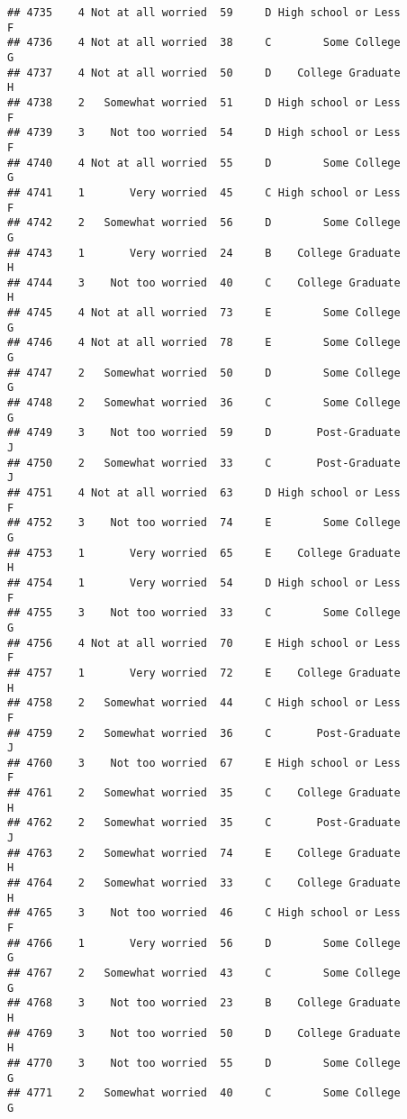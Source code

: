 \documentclass[
]{article}
\begin{document}
\begin{verbatim}
## 4735    4 Not at all worried  59     D High school or Less         F
## 4736    4 Not at all worried  38     C        Some College         G
## 4737    4 Not at all worried  50     D    College Graduate         H
## 4738    2   Somewhat worried  51     D High school or Less         F
## 4739    3    Not too worried  54     D High school or Less         F
## 4740    4 Not at all worried  55     D        Some College         G
## 4741    1       Very worried  45     C High school or Less         F
## 4742    2   Somewhat worried  56     D        Some College         G
## 4743    1       Very worried  24     B    College Graduate         H
## 4744    3    Not too worried  40     C    College Graduate         H
## 4745    4 Not at all worried  73     E        Some College         G
## 4746    4 Not at all worried  78     E        Some College         G
## 4747    2   Somewhat worried  50     D        Some College         G
## 4748    2   Somewhat worried  36     C        Some College         G
## 4749    3    Not too worried  59     D       Post-Graduate         J
## 4750    2   Somewhat worried  33     C       Post-Graduate         J
## 4751    4 Not at all worried  63     D High school or Less         F
## 4752    3    Not too worried  74     E        Some College         G
## 4753    1       Very worried  65     E    College Graduate         H
## 4754    1       Very worried  54     D High school or Less         F
## 4755    3    Not too worried  33     C        Some College         G
## 4756    4 Not at all worried  70     E High school or Less         F
## 4757    1       Very worried  72     E    College Graduate         H
## 4758    2   Somewhat worried  44     C High school or Less         F
## 4759    2   Somewhat worried  36     C       Post-Graduate         J
## 4760    3    Not too worried  67     E High school or Less         F
## 4761    2   Somewhat worried  35     C    College Graduate         H
## 4762    2   Somewhat worried  35     C       Post-Graduate         J
## 4763    2   Somewhat worried  74     E    College Graduate         H
## 4764    2   Somewhat worried  33     C    College Graduate         H
## 4765    3    Not too worried  46     C High school or Less         F
## 4766    1       Very worried  56     D        Some College         G
## 4767    2   Somewhat worried  43     C        Some College         G
## 4768    3    Not too worried  23     B    College Graduate         H
## 4769    3    Not too worried  50     D    College Graduate         H
## 4770    3    Not too worried  55     D        Some College         G
## 4771    2   Somewhat worried  40     C        Some College         G

\end{verbatim}
\end{document}
